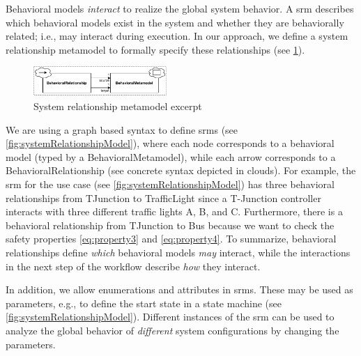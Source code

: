 \documentclass{jot}
\begin{document}
Behavioral models \emph{interact} to realize the global system behavior.
A \gls*{srm} describes which behavioral models exist in the system and whether they are behaviorally related; i.e., may interact during execution.
In our approach, we define a system relationship metamodel to formally specify these relationships (see \cref{fig:systemRelationshipMetamodel}).

\begin{figure}[h]
    \centering
    \includegraphics[width=0.45\textwidth]{figures/systemRelationshipMetamodel.pdf}
    \caption{System relationship metamodel excerpt}
    \label{fig:systemRelationshipMetamodel}
\end{figure}

We are using a graph based syntax to define \gls*{srm}s (see \cref{fig:systemRelationshipModel}), where each node corresponds to a behavioral model (typed by a \textsf{BehavioralMetamodel}), while each arrow corresponds to a \textsf{BehavioralRelationship} (see concrete syntax depicted in clouds).
For example, the \gls*{srm} for the use case (see \cref{fig:systemRelationshipModel}) has three behavioral relationships from \textsf{TJunction} to \textsf{TrafficLight} since a T-Junction controller interacts with three different traffic lights A, B, and C.
Furthermore, there is a behavioral relationship from \textsf{TJunction} to \textsf{Bus} because we want to check the safety properties \eqref{eq:property3} and \eqref{eq:property4}. 
To summarize, behavioral relationships define \textit{which} behavioral models \textit{may} interact, while the interactions in the next step of the workflow describe \textit{how} they interact.

In addition, we allow enumerations and attributes in \gls*{srm}s.
These may be used as parameters, e.g., to define the start state in a state machine (see \cref{fig:systemRelationshipModel}).
Different instances of the \gls*{srm} can be used to analyze the global behavior of \emph{different} system configurations by changing the parameters.
\end{document}
